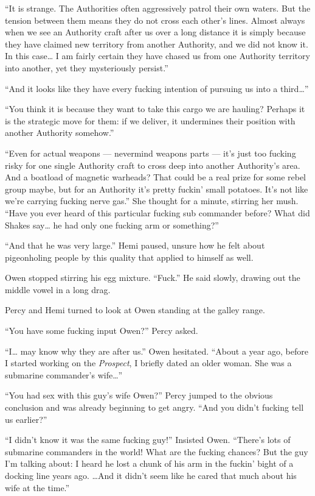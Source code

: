 \documentclass[]{scrbook}
\begin{document}
``It is strange. The Authorities often aggressively patrol their own
waters. But the tension between them means they do not cross each
other's lines. Almost always when we see an Authority craft after us
over a long distance it is simply because they have claimed new
territory from another Authority, and we did not know it. In this
case\ldots{} I am fairly certain they have chased us from one Authority
territory into another, yet they mysteriously persist.''

``And it looks like they have every fucking intention of pursuing us
into a third\ldots{}''

``You think it is because they want to take this cargo we are hauling?
Perhaps it is the strategic move for them: if we deliver, it undermines
their position with another Authority somehow.''

``Even for actual weapons --- nevermind weapons parts --- it's just too
fucking risky for one single Authority craft to cross deep into another
Authority's area. And a boatload of magnetic warheads? That could be a
real prize for some rebel group maybe, but for an Authority it's pretty
fuckin' small potatoes. It's not like we're carrying fucking nerve
gas.'' She thought for a minute, stirring her mush. ``Have you ever
heard of this particular fucking sub commander before? What did Shakes
say\ldots{} he had only one fucking arm or something?''

``And that he was very large.'' Hemi paused, unsure how he felt about
pigeonholing people by this quality that applied to himself as well.

Owen stopped stirring his egg mixture. ``Fuck.'' He said slowly, drawing
out the middle vowel in a long drag.

Percy and Hemi turned to look at Owen standing at the galley range.

``You have some fucking input Owen?'' Percy asked.

``I\ldots{} may know why they are after us.'' Owen hesitated. ``About a
year ago, before I started working on the \emph{Prospect}, I briefly
dated an older woman. She was a submarine commander's wife\ldots{}''

``You had sex with this guy's wife Owen?'' Percy jumped to the obvious
conclusion and was already beginning to get angry. ``And you didn't
fucking tell us earlier?''

``I didn't know it was the same fucking guy!'' Insisted Owen. ``There's
lots of submarine commanders in the world! What are the fucking chances?
But the guy I'm talking about: I heard he lost a chunk of his arm in the
fuckin' bight of a docking line years ago. \ldots{}And it didn't seem
like he cared that much about his wife at the time.''
\end{document}
